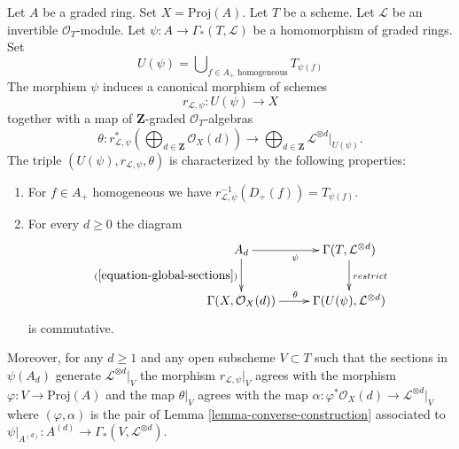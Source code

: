 \begin{lemma}
\label{lemma-invertible-map-into-proj}
Let $A$ be a graded ring.
Set $X = \text{Proj}(A)$.
Let $T$ be a scheme.
Let $\mathcal{L}$ be an invertible $\mathcal{O}_T$-module.
Let $\psi : A \to \Gamma_*(T, \mathcal{L})$ be a homomorphism
of graded rings. Set
$$
U(\psi) = \bigcup\nolimits_{f \in A_{+}\text{ homogeneous}} T_{\psi(f)}
$$
The morphism $\psi$ induces a canonical morphism of schemes
$$
r_{\mathcal{L}, \psi} :
U(\psi) \longrightarrow X
$$
together with a map of $\mathbf{Z}$-graded $\mathcal{O}_T$-algebras
$$
\theta :
r_{\mathcal{L}, \psi}^*\left(
\bigoplus\nolimits_{d \in \mathbf{Z}} \mathcal{O}_X(d)
\right)
\longrightarrow
\bigoplus\nolimits_{d \in \mathbf{Z}} \mathcal{L}^{\otimes d}|_{U(\psi)}.
$$
The triple $(U(\psi), r_{\mathcal{L}, \psi}, \theta)$ is
characterized by the following properties:
\begin{enumerate}
\item For $f \in A_{+}$ homogeneous we have
$r_{\mathcal{L}, \psi}^{-1}(D_{+}(f)) = T_{\psi(f)}$.
\item For every $d \geq 0$ the diagram
$$
\xymatrix{
A_d \ar[d]_{(\ref{equation-global-sections})} \ar[r]_{\psi} &
\Gamma(T, \mathcal{L}^{\otimes d}) \ar[d]^{restrict} \\
\Gamma(X, \mathcal{O}_X(d)) \ar[r]^{\theta} &
\Gamma(U(\psi), \mathcal{L}^{\otimes d})
}
$$
is commutative.
\end{enumerate}
Moreover, for any $d \geq 1$ and any open subscheme $V \subset T$
such that the sections in $\psi(A_d)$ generate $\mathcal{L}^{\otimes d}|_V$
the morphism $r_{\mathcal{L}, \psi}|_V$ agrees with the morphism
$\varphi : V \to \text{Proj}(A)$ and the map $\theta|_V$ agrees with the map
$\alpha : \varphi^*\mathcal{O}_X(d) \to \mathcal{L}^{\otimes d}|_V$
where $(\varphi, \alpha)$ is the pair
of Lemma \ref{lemma-converse-construction}
associated to
$\psi|_{A^{(d)}} : A^{(d)} \to \Gamma_*(V, \mathcal{L}^{\otimes d})$.
\end{lemma}

